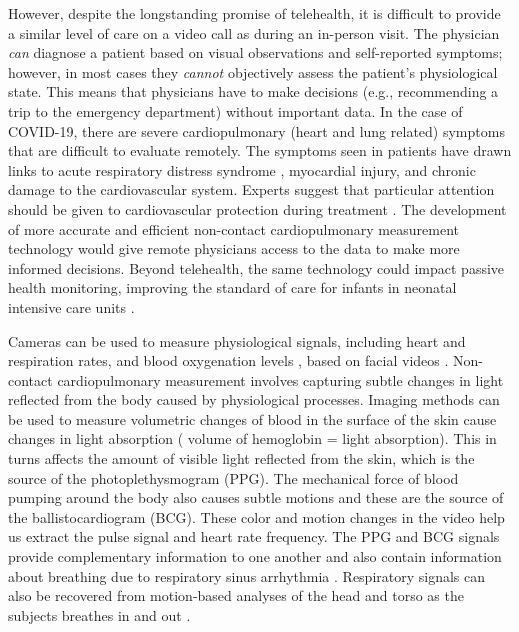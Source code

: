 \documentclass{article}
\begin{document}
However, despite the longstanding promise of telehealth, it is difficult to provide a similar level of care on a video call as during an in-person visit. The physician \textit{can} diagnose a patient based on visual observations and self-reported symptoms; however, in most cases they \textit{cannot} objectively assess the patient's physiological state. This means that physicians have to make decisions (e.g., recommending a trip to the emergency department) without important data. In the case of COVID-19, there are severe cardiopulmonary (heart and lung related) symptoms that are difficult to evaluate remotely. The symptoms seen in patients have drawn links to acute respiratory distress syndrome \citep{xu2020pathological}, myocardial injury, and chronic damage to the cardiovascular system. Experts suggest that particular attention should be given to cardiovascular protection during treatment \citep{zheng2020covid}. The development of more accurate and efficient non-contact cardiopulmonary measurement technology would give remote physicians access to the data to make more informed decisions. Beyond telehealth, the same technology could impact passive health monitoring, improving the standard of care for infants in neonatal intensive care units  \citep{villarroel2019non}.

Cameras can be used to measure physiological signals, including heart and respiration rates, and blood oxygenation levels \citep{poh2010non,guazzi2015non,chen2018deepphys}, based on facial videos \citep{takano2007heart,verkruysse2008remote}. Non-contact cardiopulmonary measurement involves capturing subtle changes in light reflected from the body caused by physiological processes. Imaging methods can be used to measure volumetric changes of blood in the surface of the skin cause changes in light absorption ( volume of hemoglobin =  light absorption). This in turns affects the amount of visible light reflected from the skin, which is the source of the photoplethysmogram (PPG). The mechanical force of blood pumping around the body also causes subtle motions and these are the source of the ballistocardiogram (BCG). These color and motion changes in the video help us extract the pulse signal and heart rate frequency. The PPG and BCG signals provide complementary information to one another and also contain information about breathing due to respiratory sinus arrhythmia \citep{poh2010advancements}. Respiratory signals can also be recovered from motion-based analyses of the head and torso as the subjects breathes in and out \citep{tarassenko2014non}.
\end{document}
